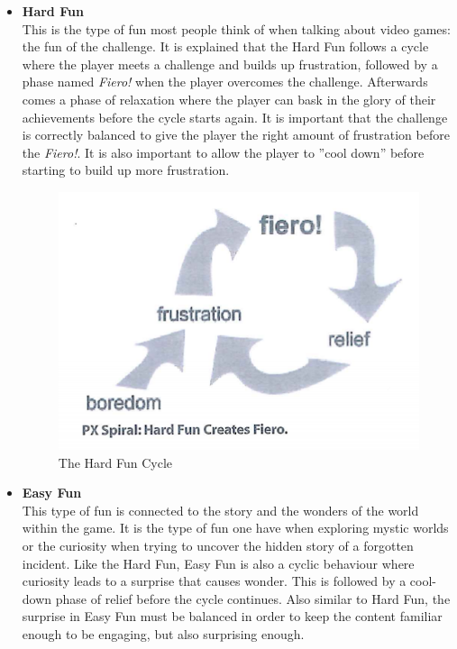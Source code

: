         \begin{itemize}
            \item \textbf{Hard Fun}\\
            This is the type of fun most people think of when talking about video games: the fun of the challenge. It is explained that the Hard Fun follows a cycle where the player meets a challenge and builds up frustration, followed by a phase named \emph{Fiero!} when the player overcomes the challenge. Afterwards comes a phase of relaxation where the player can bask in the glory of their achievements before the cycle starts again. It is important that the challenge is correctly balanced to give the player the right amount of frustration before the \emph{Fiero!}. It is also important to allow the player to ''cool down'' before starting to build up more frustration.
            
            \FloatBarrier
            \begin{figure}[ht]
                \centering
                \includegraphics[width=0.5\linewidth]{figures/hard_fun.png}
                \caption{The Hard Fun Cycle}
                \label{fig:hard_fun}
            \end{figure}
            \FloatBarrier
            
            \item \textbf{Easy Fun}\\
            This type of fun is connected to the story and the wonders of the world within the game. It is the type of fun one have when exploring mystic worlds or the curiosity when trying to uncover the hidden story of a forgotten incident. Like the Hard Fun, Easy Fun is also a cyclic behaviour where curiosity leads to a surprise that causes wonder. This is followed by a cool-down phase of relief before the cycle continues. Also similar to Hard Fun, the surprise in Easy Fun must be balanced in order to keep the content familiar enough to be engaging, but also surprising enough.
            

\end{itemize}
